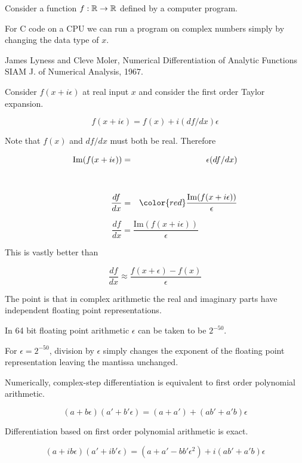 {Consider a function $f:\mathbb{R} \rightarrow \mathbb{R}$ defined by a computer program.

\vfill
For C code on a CPU we can run a program on complex numbers simply by changing the data type of $x$.

\vfill
James Lyness and Cleve Moler, Numerical Differentiation of Analytic Functions SIAM J. of Numerical Analysis, 1967.


Consider $f(x + i\epsilon)$ at real input $x$ and consider the first order Taylor expansion.

$$f(x+ i\epsilon) = f(x) + i(df/dx)\epsilon$$

\vfill
Note that $f(x)$ and $df/dx$ must both be real.  Therefore

\vfill
\begin{eqnarray*}
  \mathrm{Im}(f(x + i \epsilon)) & = & \epsilon (df/dx) \\
  \\
  \\
  \frac{df}{dx} & = & {\color{red} \frac{\mathrm{Im}(f(x + i \epsilon))}{\epsilon}}
\end{eqnarray*}



$$\frac{df}{dx}  = \frac{\mathrm{Im}(f(x + i \epsilon))}{\epsilon}$$

\vfill
This is vastly better than

$$\frac{df}{dx} \approx \frac{f(x + \epsilon) - f(x)}{\epsilon}$$

\vfill
The point is that in complex arithmetic the real and imaginary parts have independent floating point representations.

\vfill
In 64 bit floating point arithmetic $\epsilon$ can be taken to be $2^{-50}$.

\vfill
For $\epsilon = 2^{-50}$, division by $\epsilon$ simply changes the exponent of the floating point representation leaving the mantissa unchanged.


\vfill
Numerically, complex-step differentiation is equivalent to
first order polynomial arithmetic.

\vfill
$$(a + b\epsilon)(a' + b'\epsilon) = (a+a') + (ab' + a'b)\epsilon$$

\vfill
Differentiation based on first order polynomial arithmetic is exact.

$$(a + ib\epsilon)(a' + ib'\epsilon) = (a+a' - bb'\epsilon^2) + i(ab' + a'b)\epsilon$$

}
